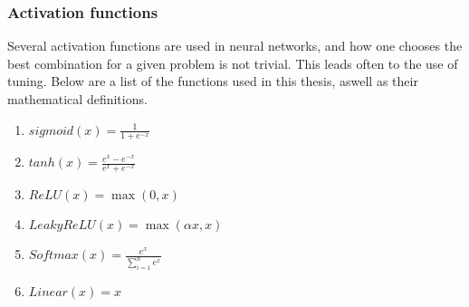 \subsubsection*{Activation functions}
Several activation functions are used in neural networks, and how one chooses the best combination for a given problem is not trivial. 
This leads often to the use of tuning. Below are a list of the functions used in this thesis, aswell as their mathematical definitions. 

\begin{enumerate}
    \item  $sigmoid(x) = \frac{1}{1+e^{-x}}$
    \item $tanh(x) = \frac{e^x-e^{-x}}{e^x+e^{-x}}$
    \item $ReLU(x) = \max(0,x)$
    \item $LeakyReLU(x) = \max(\alpha x,x)$
    \item $Softmax(x) = \frac{e^x}{\sum_{i=1}^n e^x}$
    \item $Linear(x) = x$
\end{enumerate}
